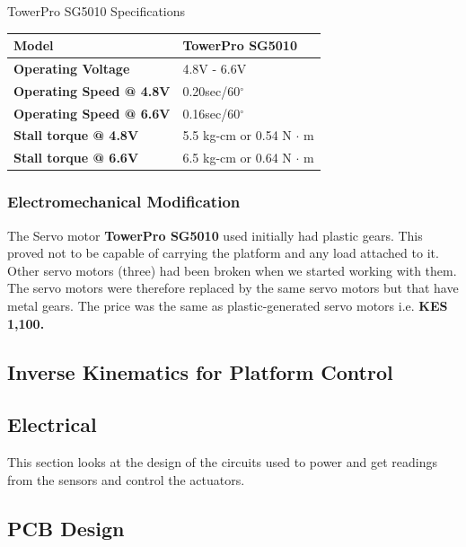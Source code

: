 \begin{table}[!h]
\caption[Motor Specifications]{TowerPro SG5010 Specifications}
\end{table}
\begin{center}
\begin{tabular}{|l|l|}
\hline
\textbf{Model}& TowerPro SG5010\\
\hline
\textbf{Operating Voltage} & 4.8V - 6.6V\\
\hline
\textbf{Operating Speed @ 4.8V} & 0.20sec/60$^{\circ}$\\
\hline
\textbf{Operating Speed @ 6.6V}& 0.16sec/60$^{\circ}$\\
\hline
\textbf{Stall torque @ 4.8V} & 5.5 kg-cm or 0.54 N $\cdot$ m\\
\hline
\textbf{Stall torque @ 6.6V} & 6.5 kg-cm or 0.64 N $\cdot$ m\\
\hline
\end{tabular}
\end{center}
\subsubsection{Electromechanical Modification}
The Servo motor \textbf{TowerPro SG5010} used initially had plastic gears. This proved not to be capable of carrying the
platform and any load attached to it. Other servo motors (three) had been broken when we started working with them. The
servo motors were therefore replaced by the same servo motors but that have metal gears. The price was the same as plastic-generated
servo motors i.e. \textbf{KES 1,100.}

\subsection{Inverse Kinematics for Platform Control}

\subsection{Electrical}
This section looks at the design of the circuits used to power and get readings from the sensors and control the actuators.
\subsection{PCB Design}
